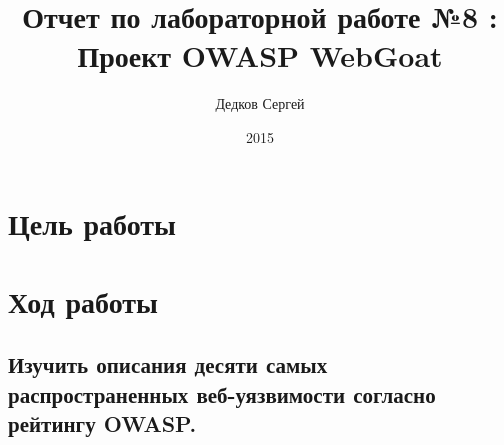 \documentclass[11pt, a4paper]{article}		%
\author{Дедков Сергей}
\title{Отчет по лабораторной работе №8 :\\ Проект OWASP WebGoat}
\date{2015}
\begin{document}
\maketitle
\tableofcontents
\newpage



\section{Цель работы}



\section{Ход работы}



\subsection{Изучить описания десяти самых распространенных веб-уязвимости согласно рейтингу OWASP.}
\end{document}
